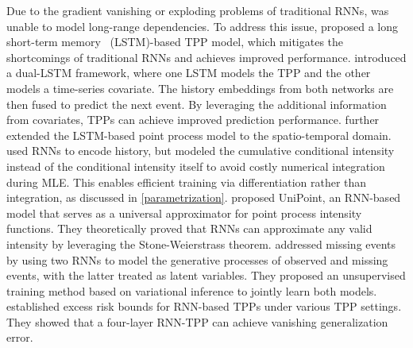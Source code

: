 \documentclass[10pt]{article} %
\begin{document}
Due to the gradient vanishing or exploding problems of traditional RNNs, \citet{du2016recurrent} was unable to model long-range dependencies. 
To address this issue, \citet{mei2017neural} proposed a long short-term memory~\citep{hochreiter1997long} (LSTM)-based TPP model, which mitigates the shortcomings of traditional RNNs and achieves improved performance. 
\citet{xiao2017modeling} introduced a dual-LSTM framework, where one LSTM models the TPP and the other models a time-series covariate. The history embeddings from both networks are then fused to predict the next event. 
By leveraging the additional information from covariates, TPPs can achieve improved prediction performance. 
\citet{yang2018recurrent} further extended the LSTM-based point process model to the spatio-temporal domain. 
\citet{omi2019fully} used RNNs to encode history, but modeled the cumulative conditional intensity instead of the conditional intensity itself to avoid costly numerical integration during MLE. This enables efficient training via differentiation rather than integration, as discussed in \cref{parametrization}. 
\citet{soen2021unipoint} proposed UniPoint, an RNN-based model that serves as a universal approximator for point process intensity functions. They theoretically proved that RNNs can approximate any valid intensity by leveraging the Stone-Weierstrass theorem. 
\citet{gupta2021learning} addressed missing events by using two RNNs to model the generative processes of observed and missing events, with the latter treated as latent variables. They proposed an unsupervised training method based on variational inference to jointly learn both models. 
\citet{chen2024non} established excess risk bounds for RNN-based TPPs under various TPP settings. They showed that a four-layer RNN-TPP can achieve vanishing generalization error. 

\end{document}
